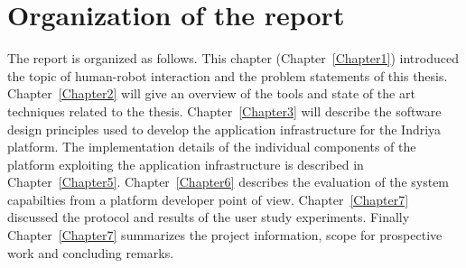 \section{Organization of the report}
\label{sec:organization}
The report is organized as follows. This chapter (Chapter~\ref{Chapter1}) introduced the topic of human-robot interaction and the problem statements of this thesis. Chapter~\ref{Chapter2} will give an overview of the tools and state of the art techniques related to the thesis. Chapter~\ref{Chapter3} will describe the software design principles used to develop the application infrastructure for the Indriya platform. The implementation details of the individual components of the platform exploiting the application infrastructure is described in Chapter~\ref{Chapter5}. Chapter~\ref{Chapter6} describes the evaluation of the system capabilties from a platform developer point of view. Chapter~\ref{Chapter7} discussed the protocol and results of the user study experiments. Finally Chapter~\ref{Chapter7} summarizes the project information, scope for prospective work and concluding remarks.
